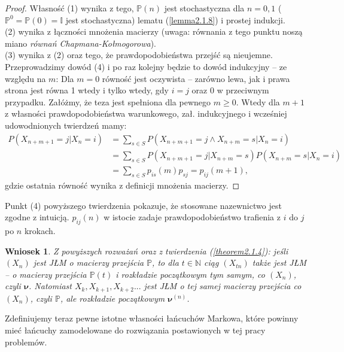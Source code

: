 \documentclass[a4paper]{article}
\theoremstyle{defn}
\theoremstyle{theorem}
\theoremstyle{lemma}
\theoremstyle{cor}
\newtheorem{cor}[defn]{Wniosek}
\theoremstyle{fact}
\begin{document}
\begin{proof}
Własność (1) wynika z tego, $\mathbb{P}(n)$ jest stochastyczna dla $n= 0,1$ ($\mathbb{P}^0 = \mathbb{P}(0) = \mathbb{I}$ jest stochastyczna) lematu (\ref{lemma2.1.8}) i prostej indukcji.
\\(2) wynika z łączności mnożenia macierzy (uwaga: równania z tego punktu noszą miano \textit{równań Chapmana-Kołmogorowa}). \\
(3) wynika z (2) oraz tego, że prawdopodobieństwa przejść są nieujemne.\\
Przeprowadzimy dowód (4) i po raz kolejny będzie to dowód indukcyjny – ze względu na $m$:
Dla $m=0$ równość jest oczywista – zarówno lewa, jak i prawa strona jest równa 1 wtedy i tylko wtedy, gdy $i = j$ oraz 0 w przeciwnym przypadku. Załóżmy, że teza jest spełniona dla pewnego $m \geq 0$. Wtedy dla $m+1$ z własności prawdopodobieństwa warunkowego, zał. indukcyjnego i wcześniej udowodnionych twierdzeń mamy: \begin{align*}
    P(X_{n+m+1}=j|X_n = i) &= \sum\limits_{s \in S} P(X_{n+m+1}=j \land X_{n+m}=s |X_n = i) \\
    &= \sum\limits_{s \in S} P(X_{n+m+1}=j | X_{n+m}=s)P(X_{n+m}=s|X_n = i) \\
    &= \sum\limits_{s \in S} p_{is}(m)p_{sj} = p_{ij}(m+1),
\end{align*}
gdzie ostatnia równość wynika z definicji mnożenia macierzy.
\end{proof}
Punkt (4) powyższego twierdzenia pokazuje, że stosowane nazewnictwo jest zgodne z intuicją. $p_{ij}(n)$ w istocie zadaje prawdopodobieństwo trafienia z $i$ do $j$ po $n$ krokach.

\begin{cor}\label{cor2.1.14}
Z powyższych rozważań oraz z twierdzenia (\ref{theorem2.1.4}): jeśli $(X_n)$ jest JŁM o macierzy przejścia $\mathbb{P}$, to dla $t \in \mathbb{N}$ ciąg $(X_{tn})$ także jest JŁM – o macierzy przejścia $\mathbb{P}(t)$ i rozkładzie początkowym tym samym, co $(X_n)$, czyli $\boldsymbol{\nu}$. Natomiast $X_{k}, X_{k+1}, X_{k+2}...$ jest JŁM o tej samej macierzy przejścia co $(X_n)$, czyli $\mathbb{P}$, ale rozkładzie początkowym $\boldsymbol{\nu}^{(n)}$.
\end{cor}

Zdefiniujemy teraz pewne istotne własności łańcuchów Markowa, które powinny mieć łańcuchy zamodelowane do rozwiązania postawionych w tej pracy problemów.
\end{document}
